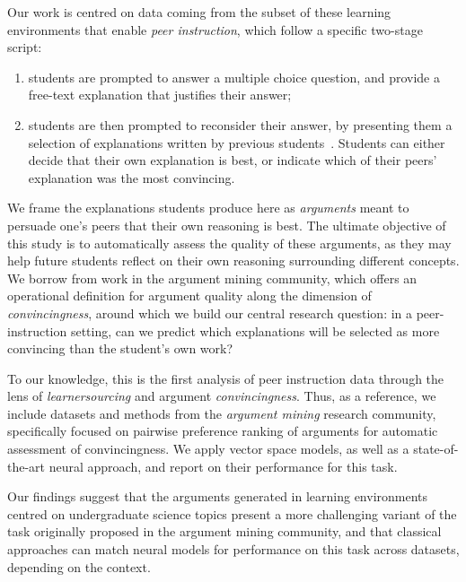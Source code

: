 \documentclass[runningheads]{llncs}
\begin{document}
Our work is centred on data coming from the subset of these learning 
environments that enable \textit{peer instruction}\cite{crouch_peer_2001}, 
which follow a specific two-stage script: 
\begin{enumerate}
	\item students are prompted to answer a multiple choice question, and 
	provide a free-text explanation that justifies their answer;
	\item students are then prompted to reconsider their answer, by presenting 
	them a selection of explanations written by previous 
	students~\cite{bhatnagar_dalite:_2016}.
	Students can either decide that their own explanation is best, or indicate 
	which of their peers' explanation was the most convincing.
\end{enumerate}

We frame the explanations students produce here as \textit{arguments} 
meant to persuade one's peers that their own reasoning is best.
The ultimate objective of this study is to automatically assess the quality of 
these arguments, as they may help future students reflect on their own 
reasoning surrounding different concepts.
We borrow from work in the argument mining community, which offers an 
operational definition for argument quality along the dimension of 
\textit{convincingness}, around which we build our central research question: 
in a peer-instruction setting, can we predict which explanations will be 
selected as more convincing than the student's own work? 

To our knowledge, this is the first analysis of peer instruction data through 
the lens of \textit{learnersourcing} and argument \textit{convincingness}.
Thus, as a reference, we include datasets and methods from the \textit{argument 
mining} research community, specifically focused on pairwise preference ranking 
of arguments for automatic assessment of convincingness.
We apply vector space models, as well as a state-of-the-art neural approach, 
and report on their performance for this task.

Our findings suggest that the arguments generated in learning environments 
centred on undergraduate science topics present a more challenging variant of 
the task originally proposed in the argument mining community, and that 
classical approaches can match neural models for performance on this task 
across datasets, depending on the context.
\end{document}
